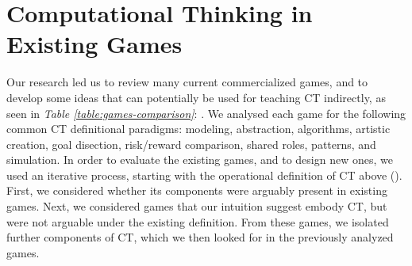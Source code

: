 \documentclass{acm_proc_article-sp}
\begin{document}


\section{Computational Thinking in Existing Games}
\label{sec:CT_current_games}
Our research led us to review many current commercialized games, and to develop some ideas that can potentially be used for teaching CT indirectly, as seen in \textit{Table \ref{table:games-comparison}}: \textit{}.
We analysed each game for the following common CT definitional paradigms: modeling, abstraction, algorithms, artistic creation, goal disection, risk/reward comparison, shared roles, patterns, and simulation.
In order to evaluate the existing games, and to design new ones, we used an iterative process, starting with the operational definition of CT above (\cite{operationalct}).
First, we considered whether its components were arguably present in existing games.
Next, we considered games that our intuition suggest embody CT, but were not arguable under the existing definition.
From these games, we isolated further components of CT, which we then looked for in the previously analyzed games.
\end{document}
